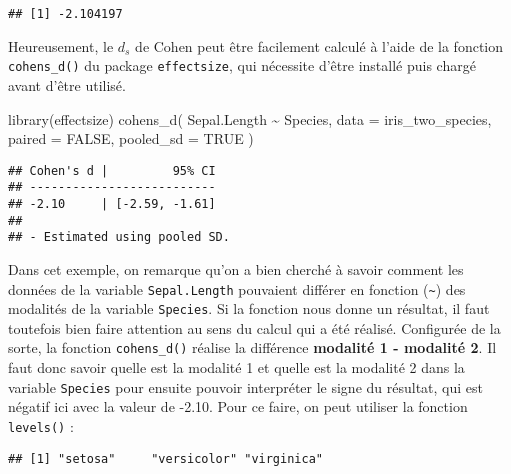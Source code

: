 \documentclass[
]{book}
\newenvironment{Shaded}{\begin{snugshade}}{\end{snugshade}}
\newcommand{\AttributeTok}[1]{\textcolor[rgb]{0.77,0.63,0.00}{#1}}
\newcommand{\ConstantTok}[1]{\textcolor[rgb]{0.00,0.00,0.00}{#1}}
\newcommand{\FunctionTok}[1]{\textcolor[rgb]{0.00,0.00,0.00}{#1}}
\newcommand{\NormalTok}[1]{#1}
\newcommand{\SpecialCharTok}[1]{\textcolor[rgb]{0.00,0.00,0.00}{#1}}
\begin{document}
\begin{verbatim}
## [1] -2.104197
\end{verbatim}

Heureusement, le \(d_{s}\) de Cohen peut être facilement calculé à l'aide de la fonction \texttt{cohens\_d()} du package \texttt{effectsize}, qui nécessite d'être installé puis chargé avant d'être utilisé.

\begin{Shaded}
\begin{Highlighting}[]
\FunctionTok{library}\NormalTok{(effectsize)}
\FunctionTok{cohens\_d}\NormalTok{(}
\NormalTok{  Sepal.Length }\SpecialCharTok{\textasciitilde{}}\NormalTok{ Species, }
  \AttributeTok{data =}\NormalTok{ iris\_two\_species, }
  \AttributeTok{paired =} \ConstantTok{FALSE}\NormalTok{, }
  \AttributeTok{pooled\_sd =} \ConstantTok{TRUE}
\NormalTok{  )}
\end{Highlighting}
\end{Shaded}

\begin{verbatim}
## Cohen's d |         95% CI
## --------------------------
## -2.10     | [-2.59, -1.61]
## 
## - Estimated using pooled SD.
\end{verbatim}

Dans cet exemple, on remarque qu'on a bien cherché à savoir comment les données de la variable \texttt{Sepal.Length} pouvaient différer en fonction (\texttt{\textasciitilde{}}) des modalités de la variable \texttt{Species}. Si la fonction nous donne un résultat, il faut toutefois bien faire attention au sens du calcul qui a été réalisé. Configurée de la sorte, la fonction \texttt{cohens\_d()} réalise la différence \textbf{modalité 1 - modalité 2}. Il faut donc savoir quelle est la modalité 1 et quelle est la modalité 2 dans la variable \texttt{Species} pour ensuite pouvoir interpréter le signe du résultat, qui est négatif ici avec la valeur de -2.10. Pour ce faire, on peut utiliser la fonction \texttt{levels()} :

\begin{Shaded}
\end{Shaded}

\begin{verbatim}
## [1] "setosa"     "versicolor" "virginica"
\end{verbatim}
\end{document}
